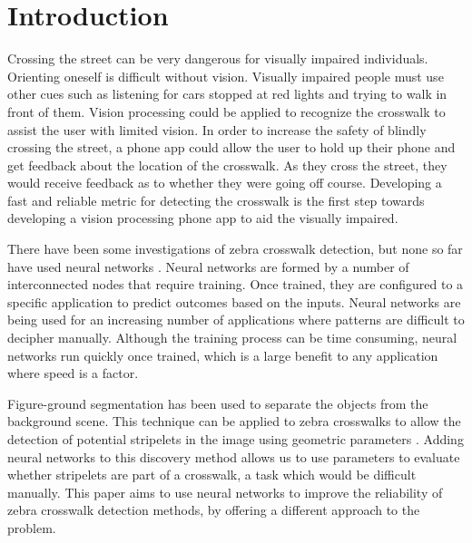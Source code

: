 \documentclass[12pt]{ucthesis}
\begin{document}
\pagestyle{plain}

\renewcommand{\baselinestretch}{1.66}


\chapter{Introduction}
\label{intro}

Crossing the street can be very dangerous for visually impaired individuals. Orienting oneself is difficult without vision. Visually impaired people must use other cues such as listening for cars stopped at red lights and trying to walk in front of them. Vision processing could be applied to recognize the crosswalk to assist the user with limited vision. In order to increase the safety of blindly crossing the street, a phone app could allow the user to hold up their phone and get feedback about the location of the crosswalk. As they cross the street, they would receive feedback as to whether they were going off course. Developing a fast and reliable metric for detecting the crosswalk is the first step towards developing a vision processing phone app to aid the visually impaired.

There have been some investigations of zebra crosswalk detection, but none so far have used neural networks \cite{Coughlan2006}\cite{ZebraPhone}\cite{relatedworkbipolarity}. Neural networks are formed by a number of interconnected nodes that require training. Once trained, they are configured to a specific application to predict outcomes based on the inputs. Neural networks are being used for an increasing number of applications where patterns are difficult to decipher manually. Although the training process can be time consuming, neural networks run quickly once trained, which is a large benefit to any application where speed is a factor. 

Figure-ground segmentation has been used to separate the objects from the background scene. This technique can be applied to zebra crosswalks to allow the detection of potential stripelets in the image using geometric parameters \cite{Coughlan2006}. Adding neural networks to this discovery method allows us to use parameters to evaluate whether stripelets are part of a crosswalk, a task which would be difficult manually. This paper aims to use neural networks to improve the reliability of zebra crosswalk detection methods, by offering a different approach to the problem.

\end{document}

